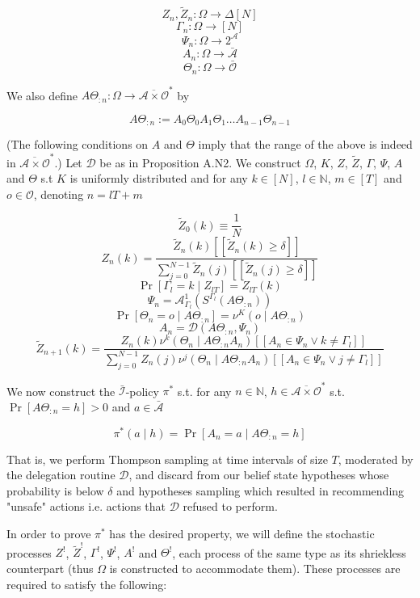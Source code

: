 \documentclass[a4paper]{article}
\newcommand{\Comment}[1]{}
\newcommand{\Nats}{\mathbb{N}}
\newcommand{\Ob}{\mathcal{O}}
\newcommand{\A}{\mathcal{A}}
\newcommand{\In}{\mathcal{I}}
\newcommand{\Ado}{\bar{\Ob}}
\newcommand{\Ada}{\bar{\A}}
\newcommand{\Adi}{{\bar{\In}}}
\newcommand{\Adao}{\overline{\A \times \Ob}}
\newcommand{\Adfh}{\Adao^*}
\newcommand{\D}{\mathcal{D}}
\newcommand{\F}{\mathcal{F}}
\newcommand{\Z}{Z}
\begin{document}
$$\Z_n,\tilde{\Z}_n: \Omega \rightarrow \Delta[N]$$
%
$$\Gamma_n: \Omega \rightarrow [N]$$
%
$$\Psi_n: \Omega \rightarrow 2^\A$$
%
$$A_n: \Omega \rightarrow \Ada$$
%
$$\Theta_n: \Omega \rightarrow \Ado$$

We also define $A\Theta_{:n}: \Omega \rightarrow \Adfh$ by

$$A\Theta_{:n}:= A_0\Theta_0A_1\Theta_1 \ldots A_{n-1}\Theta_{n-1}$$

(The following conditions on $A$ and $\Theta$ imply that the range of the above is indeed in $\Adfh$.) Let $\D$ be as in Proposition A.N2. We construct $\Omega$\Comment{, $\F$}, $K$, $\Z$, $\tilde{\Z}$, $\Gamma$, $\Psi$, $A$ and $\Theta$ s.t $K$ is uniformly distributed and for any $k \in [N]$, $l \in \Nats$, $m \in [T]$ and $o \in \Ob$, denoting $n = lT+m$

$$\tilde{\Z}_0(k)\equiv\frac{1}{N}$$
%
$$\Z_{n}(k) = \frac{\tilde{\Z}_{n}(k)[[\tilde{\Z}_{n}(k) \geq \delta]] }{\sum_{j = 0}^{N-1}\tilde{\Z}_{n}(j)[[\tilde{\Z}_{n}(j) \geq \delta]]}$$
%
$$\Pr\left[\Gamma_{l} = k \mid Z_{lT}\right] = \Z_{lT}\left(k\right)$$
%
$$\Psi_{n} = \A^1_{\Gamma_l}\left(S^{\Gamma_l}(A\Theta_{:n})\right)$$
%
$$\Pr\left[\Theta_{n} = o \mid A\Theta_{:n}\right] = \nu^K\left(o \mid A\Theta_{:n}\right)$$
%
$$A_n = \D\left(A\Theta_{:n}, \Psi_n\right)$$
%
$$\tilde{\Z}_{n+1}(k)=\frac{\Z_{n}(k) \nu^k\left(\Theta_{n} \mid A\Theta_{:n}A_{n}\right)[[A_{n} \in \Psi_{n} \lor k \ne \Gamma_l]]}{\sum_{j = 0}^{N-1} \Z_n(j) \nu^j(\Theta_n \mid A\Theta_{:n}A_n)[[A_{n} \in \Psi_{n} \lor j \ne \Gamma_l]]}$$

We now construct the $\Adi$-policy $\pi^*$ s.t. for any $n \in \Nats$, $h \in \Adfh$ s.t. $\Pr\left[A\Theta_{:n}=h\right] > 0$ and $a \in \Ada$

$$\pi^*(a \mid h)=\Pr\left[A_n = a \mid A\Theta_{:n} = h\right]$$

That is, we perform Thompson sampling at time intervals of size $T$, moderated by the delegation routine $\D$, and discard from our belief state hypotheses whose probability is below $\delta$ and hypotheses sampling which resulted in recommending "unsafe" actions i.e. actions that $\D$ refused to perform.

In order to prove $\pi^*$ has the desired property, we will define the stochastic processes $\Z^!$, $\tilde{\Z}^!$, $\Gamma^!$, $\Psi^!$, $A^!$ and $\Theta^!$, each process of the same type as its shriekless counterpart (thus $\Omega$ is constructed to accommodate them). These processes are required to satisfy the following:
\end{document}
